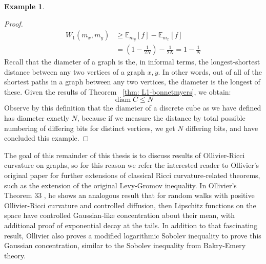 \documentclass{Dissertate}
\theoremstyle{definition}
\theoremstyle{definition} %
\theoremstyle{definition}
\newtheorem{example}[theorem]{Example}
\begin{document}
\begin{example}
\begin{proof}
\[
\begin{aligned}
W_1(m_x, m_y) &\geq \mathbb{E}_{m_y}[f] - \mathbb{E}_{m_x}[f] \\
&= \left(1 - \frac{1}{2N} \right) - \frac{1}{2N} = 1 - \frac{1}{N}
\end{aligned}
\]
Recall that the diameter of a graph is the, in informal terms, the longest-shortest distance between any two vertices of a graph $x,y$. In other words, out of all of the shortest paths in a graph between any two vertices, the diameter is the longest of these. Given the results of Theorem ~\ref{thm: L1-bonnetmyers}, we obtain:
$$
\operatorname{diam}C \leq N
$$
Observe by this definition that the diameter of a discrete cube as we have defined has diameter exactly $N$, because if we measure the distance by total possible numbering of differing bits for distinct vertices, we get $N$ differing bits, and have concluded this example. 
\end{proof}
\end{example}



The goal of this remainder of this thesis is to discuss results of Ollivier-Ricci curvature on graphs, so for this reason we refer the interested reader to Ollivier's original paper  for further extensions of classical Ricci curvature-related theorems, such as the extension of the original Levy-Gromov inequality. In Ollivier's Theorem 33 \cite{ollivier_ricci_2009}, he shows an analogous result that for random walks with positive Ollivier-Ricci curvature and controlled diffusion, then Lipschitz functions on the space have controlled Gaussian-like concentration about their mean, with additional proof of exponential decay at the tails. In addition to that fascinating result, Ollivier also proves a modified logarithmic Sobolev inequality to prove this Gaussian concentration, similar to the Sobolev inequality from Bakry-Emery theory. 
\end{document}
